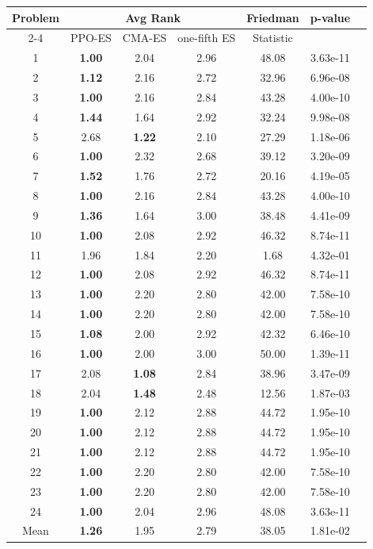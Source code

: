 
        \begin{tabular}{ccccccc}
        \toprule
        \multirow{2}{*}{Problem} & \multicolumn{3}{c}{Avg Rank} & Friedman & \multirow{2}{*}{p-value} \\
        \cline{2-4}
        & PPO-ES & CMA-ES & one-fifth ES & Statistic & \\
        \midrule
        1 & \textbf{1.00} & 2.04 & 2.96 & 48.08 & 3.63e-11 \\
2 & \textbf{1.12} & 2.16 & 2.72 & 32.96 & 6.96e-08 \\
3 & \textbf{1.00} & 2.16 & 2.84 & 43.28 & 4.00e-10 \\
4 & \textbf{1.44} & 1.64 & 2.92 & 32.24 & 9.98e-08 \\
5 & 2.68 & \textbf{1.22} & 2.10 & 27.29 & 1.18e-06 \\
6 & \textbf{1.00} & 2.32 & 2.68 & 39.12 & 3.20e-09 \\
7 & \textbf{1.52} & 1.76 & 2.72 & 20.16 & 4.19e-05 \\
8 & \textbf{1.00} & 2.16 & 2.84 & 43.28 & 4.00e-10 \\
9 & \textbf{1.36} & 1.64 & 3.00 & 38.48 & 4.41e-09 \\
10 & \textbf{1.00} & 2.08 & 2.92 & 46.32 & 8.74e-11 \\
11 & 1.96 & 1.84 & 2.20 & 1.68 & 4.32e-01 \\
12 & \textbf{1.00} & 2.08 & 2.92 & 46.32 & 8.74e-11 \\
13 & \textbf{1.00} & 2.20 & 2.80 & 42.00 & 7.58e-10 \\
14 & \textbf{1.00} & 2.20 & 2.80 & 42.00 & 7.58e-10 \\
15 & \textbf{1.08} & 2.00 & 2.92 & 42.32 & 6.46e-10 \\
16 & \textbf{1.00} & 2.00 & 3.00 & 50.00 & 1.39e-11 \\
17 & 2.08 & \textbf{1.08} & 2.84 & 38.96 & 3.47e-09 \\
18 & 2.04 & \textbf{1.48} & 2.48 & 12.56 & 1.87e-03 \\
19 & \textbf{1.00} & 2.12 & 2.88 & 44.72 & 1.95e-10 \\
20 & \textbf{1.00} & 2.12 & 2.88 & 44.72 & 1.95e-10 \\
21 & \textbf{1.00} & 2.12 & 2.88 & 44.72 & 1.95e-10 \\
22 & \textbf{1.00} & 2.20 & 2.80 & 42.00 & 7.58e-10 \\
23 & \textbf{1.00} & 2.20 & 2.80 & 42.00 & 7.58e-10 \\
24 & \textbf{1.00} & 2.04 & 2.96 & 48.08 & 3.63e-11 \\
\midrule
Mean & \textbf{1.26} & 1.95 & 2.79 & 38.05 & 1.81e-02 \\
\bottomrule
\end{tabular}